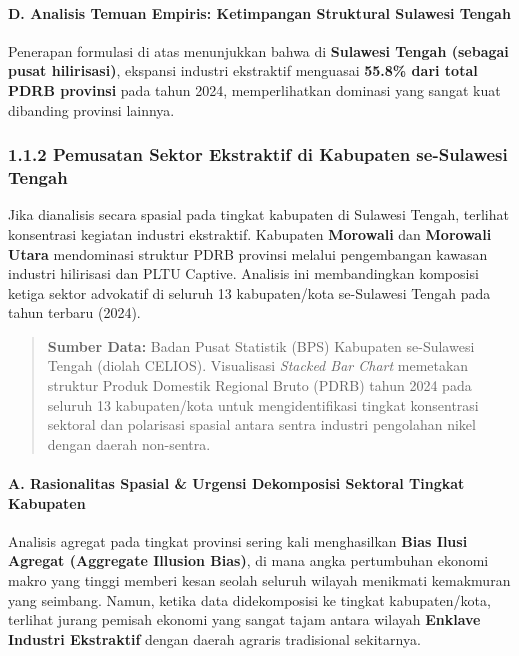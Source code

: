 \documentclass[
]{article}
\begin{document}
\paragraph{D. Analisis Temuan Empiris: Ketimpangan Struktural Sulawesi
Tengah}\label{d.-analisis-temuan-empiris-ketimpangan-struktural-sulawesi-tengah}

Penerapan formulasi di atas menunjukkan bahwa di \textbf{Sulawesi Tengah
(sebagai pusat hilirisasi)}, ekspansi industri ekstraktif menguasai
\textbf{55.8\% dari total PDRB provinsi} pada tahun 2024, memperlihatkan
dominasi yang sangat kuat dibanding provinsi lainnya.

\subsubsection{1.1.2 Pemusatan Sektor Ekstraktif di Kabupaten
se-Sulawesi
Tengah}\label{pemusatan-sektor-ekstraktif-di-kabupaten-se-sulawesi-tengah}

Jika dianalisis secara spasial pada tingkat kabupaten di Sulawesi
Tengah, terlihat konsentrasi kegiatan industri ekstraktif. Kabupaten
\textbf{Morowali} dan \textbf{Morowali Utara} mendominasi struktur PDRB
provinsi melalui pengembangan kawasan industri hilirisasi dan PLTU
Captive. Analisis ini membandingkan komposisi ketiga sektor advokatif di
seluruh 13 kabupaten/kota se-Sulawesi Tengah pada tahun terbaru (2024).

\begin{quote}
\textbf{Sumber Data:} Badan Pusat Statistik (BPS) Kabupaten se-Sulawesi
Tengah (diolah CELIOS). Visualisasi \emph{Stacked Bar Chart} memetakan
struktur Produk Domestik Regional Bruto (PDRB) tahun 2024 pada seluruh
13 kabupaten/kota untuk mengidentifikasi tingkat konsentrasi sektoral
dan polarisasi spasial antara sentra industri pengolahan nikel dengan
daerah non-sentra.
\end{quote}

\paragraph{A. Rasionalitas Spasial \& Urgensi Dekomposisi Sektoral
Tingkat
Kabupaten}\label{a.-rasionalitas-spasial-urgensi-dekomposisi-sektoral-tingkat-kabupaten}

Analisis agregat pada tingkat provinsi sering kali menghasilkan
\textbf{Bias Ilusi Agregat (Aggregate Illusion Bias)}, di mana angka
pertumbuhan ekonomi makro yang tinggi memberi kesan seolah seluruh
wilayah menikmati kemakmuran yang seimbang. Namun, ketika data
didekomposisi ke tingkat kabupaten/kota, terlihat jurang pemisah ekonomi
yang sangat tajam antara wilayah \textbf{Enklave Industri Ekstraktif}
dengan daerah agraris tradisional sekitarnya.
\end{document}

